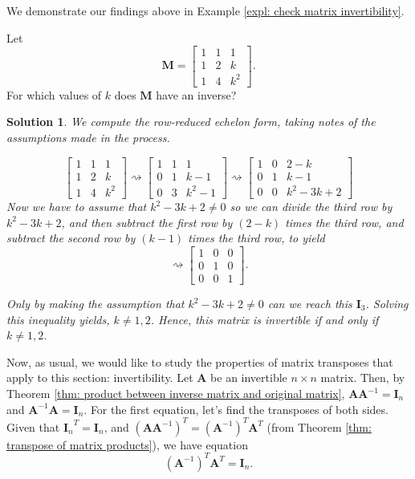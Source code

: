 \documentclass[]{book}
\newcommand{\inv}[1]{\ensuremath{{#1}^{-1}}}
\newcommand{\invm}[1]{\ensuremath{\inv{\mat{#1}}}}
\newcommand{\mat}[1]{\ensuremath{\mathbf{#1}}}
\newcommand{\idmat}[1][n]{\ensuremath{\mat{I}_#1}}
\newtheorem*{solution}{Solution}
\begin{document}
We demonstrate our findings above in Example \ref{expl: check matrix invertibility}.
\begin{example}
    \label{expl: check matrix invertibility}
    Let \[\mat{M} = \begin{bmatrix}1 & 1 & 1 \\ 1 & 2 & k \\ 1 & 4 & k^2\end{bmatrix}.\] For which values of $k$ does $\mat{M}$ have an inverse?
\begin{solution}
    We compute the row-reduced echelon form, taking notes of the assumptions made in the process.

    \[\begin{bmatrix}1 & 1 & 1 \\ 1 & 2 & k \\ 1 & 4 & k^2 \end{bmatrix} \rightsquigarrow \begin{bmatrix}\boxed{1} & 1 & 1 \\ 0 & 1 & k-1 \\ 0 & 3 & k^2 - 1\end{bmatrix} \rightsquigarrow \begin{bmatrix}\boxed{1} & 0 & 2-k \\ 0 & \boxed{1} & k-1 \\ 0 & 0 & k^2 - 3k + 2\end{bmatrix}\]
    Now we have to assume that $k^2-3k+2 \neq 0$ so we can divide the third row by $k^2 - 3k + 2$, and then subtract the first row by $(2-k)$ times the third row, and subtract the second row by $(k-1)$ times the third row, to yield
    \[\rightsquigarrow \begin{bmatrix}\boxed{1} & 0 & 0 \\ 0 & \boxed{1} & 0 \\ 0 & 0 & \boxed{1}\end{bmatrix}.\]

    Only by making the assumption that $k^2 - 3k + 2 \neq 0$ can we reach this $\idmat[3]$. Solving this inequality yields, $k \neq 1, 2$. Hence, this matrix is invertible if and only if $k \neq 1, 2$. \hfill \qedsymbol
\end{solution}
\end{example}

Now, as usual, we would like to study the properties of matrix transposes that apply to this section: invertibility. Let $\mat{A}$ be an invertible $n \times n$ matrix. Then, by Theorem \ref{thm: product between inverse matrix and original matrix}, $\mat{A}\invm{A}=\idmat$ and $\invm{A}\mat{A}=\idmat$. For the first equation, let's find the transposes of both sides. Given that $\idmat^T=\idmat$, and $\left(\mat{A}\invm{A}\right)^T = \left(\invm{A}\right)^T\mat{A}^T$ (from Theorem \ref{thm: transpose of matrix products}), we have equation
\[\left(\invm{A}\right)^T\mat{A}^T = \idmat.\]
\end{document}
